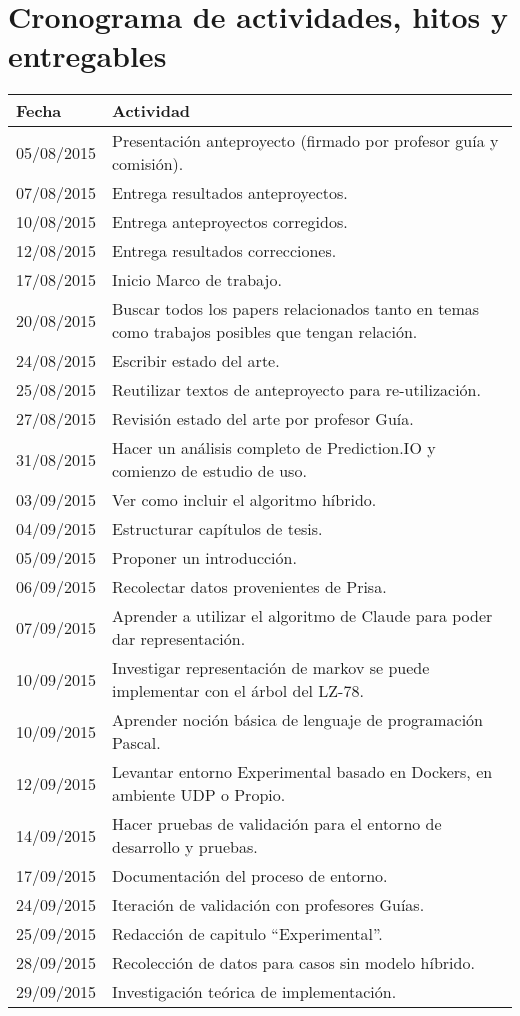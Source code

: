 \documentclass{udparticle}
\begin{document}
\section{Cronograma de actividades, hitos y entregables}
  \begin{center}
  \begin{tabular}{ll}
  \hline\noalign{\smallskip}
  Fecha & Actividad \\
  \hline\noalign{\smallskip}
  05/08/2015 & Presentación anteproyecto (firmado por profesor guía y comisión).\\
  07/08/2015 & Entrega resultados anteproyectos.\\
  10/08/2015 & Entrega anteproyectos corregidos.\\
  12/08/2015 & Entrega resultados correcciones.\\
  17/08/2015 & Inicio Marco de trabajo.\\
  20/08/2015 & Buscar todos los papers relacionados tanto en temas como trabajos posibles que tengan relación.\\
  24/08/2015 & Escribir estado del arte.\\
  25/08/2015 & Reutilizar textos de anteproyecto para re-utilización.\\
  27/08/2015 & Revisión estado del arte por profesor Guía.\\
  31/08/2015 & Hacer un análisis completo de Prediction.IO y comienzo de estudio de uso.\\
  03/09/2015 & Ver como incluir el algoritmo híbrido.\\
  04/09/2015 & Estructurar capítulos de tesis.\\
  05/09/2015 & Proponer un introducción.\\
  06/09/2015 & Recolectar datos provenientes de Prisa.\\
  07/09/2015 & Aprender a utilizar el algoritmo de Claude para poder dar representación. \\
  10/09/2015 & Investigar representación de markov se puede implementar con el árbol del LZ-78.\\
  10/09/2015 & Aprender noción básica de lenguaje de programación Pascal.\\
  12/09/2015 & Levantar entorno Experimental basado en Dockers, en ambiente UDP o Propio.\\
  14/09/2015 & Hacer pruebas de validación para el entorno de desarrollo y pruebas.\\
  17/09/2015 & Documentación del proceso de entorno.\\
  24/09/2015 & Iteración de validación con profesores Guías.\\
  25/09/2015 & Redacción de capitulo ``Experimental''.\\
  28/09/2015 & Recolección de datos para casos sin modelo híbrido.\\
  29/09/2015 & Investigación teórica de implementación.\\
  

\end{tabular}
\end{center}
\end{document}
